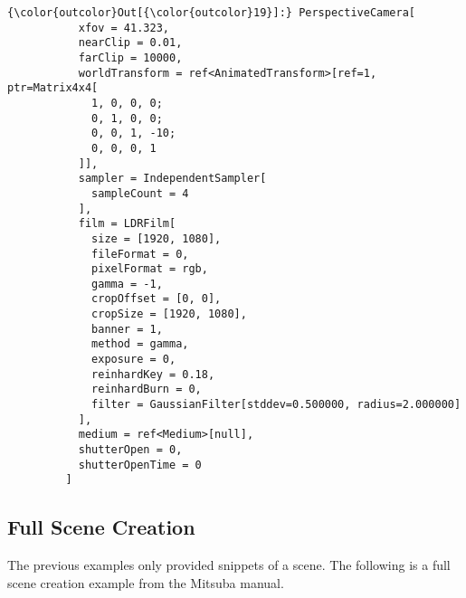 \documentclass[11pt, a4paper, landscape]{scrartcl}
\begin{document}
            \begin{Verbatim}[commandchars=\\\{\}]
{\color{outcolor}Out[{\color{outcolor}19}]:} PerspectiveCamera[
           xfov = 41.323,
           nearClip = 0.01,
           farClip = 10000,
           worldTransform = ref<AnimatedTransform>[ref=1, ptr=Matrix4x4[
             1, 0, 0, 0;
             0, 1, 0, 0;
             0, 0, 1, -10;
             0, 0, 0, 1
           ]],
           sampler = IndependentSampler[
             sampleCount = 4
           ],
           film = LDRFilm[
             size = [1920, 1080],
             fileFormat = 0,
             pixelFormat = rgb,
             gamma = -1,
             cropOffset = [0, 0],
             cropSize = [1920, 1080],
             banner = 1,
             method = gamma,
             exposure = 0,
             reinhardKey = 0.18,
             reinhardBurn = 0,
             filter = GaussianFilter[stddev=0.500000, radius=2.000000]
           ],
           medium = ref<Medium>[null],
           shutterOpen = 0,
           shutterOpenTime = 0
         ]
\end{Verbatim}
        
    \subsection{Full Scene Creation}\label{full-scene-creation}

The previous examples only provided snippets of a scene. The following
is a full scene creation example from the Mitsuba manual.
\end{document}
